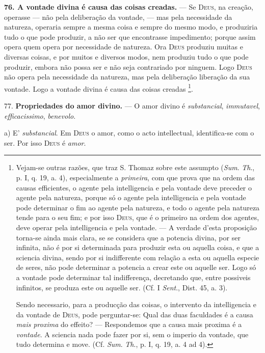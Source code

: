 \textbf{76. A vontade divina é causa das coisas creadas.} --- Se \textsc{Deus}, na creação, operasse --- não pela deliberação da vontade, --- mas pela necessidade da natureza, operaria sempre a mesma    coisa e sempre do mesmo modo, e produziria tudo o que pode produzir, a não ser que encontrasse impedimento; porque assim opera quem opera por necessidade de natureza. Ora   \textsc{Deus} produziu muitas e diversas coisas, e por muitos e diversos modos, nem produziu tudo o que pode produzir, embora   não possa ser e não seja contrariado por ninguem. Logo \textsc{Deus} não opera pela necessidade da natureza, mas pela deliberação   liberação da sua vontade. Logo a vontade divina é causa das coisas creadas \footnote{Vejam-se outras razões, que traz S. Thomaz sobre este assumpto (\emph{Sum}. \emph{Th}., p. I, q. 19, a. 4), especialmente a \emph{primeira}, com que prova que na ordem das causas efficientes, o agente pela intelligencia e pela vontade deve preceder o agente pela natureza, porque só o agente pela intelligencia e pela vontade pode determinar o fim ao agente pela natureza, e todo o agente pela natureza tende para o seu fim; e por isso \textsc{Deus}, que é o primeiro na ordem dos agentes, deve operar pela intelligencia e pela vontade. --- A verdade d'esta proposição torna-se ainda mais clara, se se considera que a potencia divina, por ser infinita, não é por si determinada para produzir esta ou aquella coisa, e que a sciencia divina, sendo por si indifferente com relação a esta ou aquella especie de seres, não pode determinar a potencia a crear este ou aquelle ser. Logo só a vontade pode determinar tal indifferença, decretando que, entre possiveis infinitos, se produza este ou aquelle ser. (Cf. I \emph{Sent}., Dist. 45, a. 3).\par Sendo necessario, para a producção das coisas, o intervento da intelligencia e da vontade de \textsc{Deus}, pode perguntar-se: Qual das duas faculdades é a causa \emph{mais proxima} do effeito? --- Respondemos que a causa mais proxima é a \emph{vontade}. A sciencia nada pode fazer por si, sem o imperio da vontade, que tudo determina e move. (Cf. \emph{Sum}. \emph{Th}., p. I, q. 19, a. 4 ad 4).}.

77. \textbf{Propriedades do amor divino.} --- O amor divino é \emph{substancial}, \emph{immutavel}, \emph{efficacissimo}, \emph{benevolo}.

a) E' \emph{substancial}. Em \textsc{Deus} o amor, como o acto intellectual, identifica-se com o ser. Por isso \textsc{Deus} é \emph{amor}.

